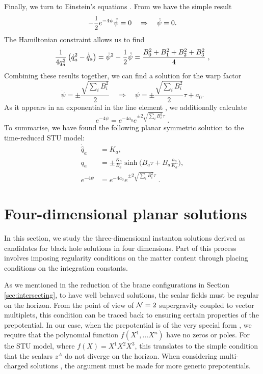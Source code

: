 Finally, we turn to Einstein's equations . From  we have the simple result
\begin{equation*}
-\frac{1}{2} e^{-4\psi} \ddot{\psi} = 0 \quad \Rightarrow \quad \ddot{\psi} = 0.
\end{equation*}
The Hamiltonian constraint  allows us to find
\begin{equation}
\frac{1}{4q_a^2} \left(\dot{q}_a^2 - \dot{\hat{q}}_a \right) = \dot{\psi}^2 - \frac{1}{2} \ddot{\psi} = \frac{B_0^2 + B_1^2 + B_2^2 + B_3^2}{4} \; ,
\end{equation}
Combining these results together, we can find a solution for the warp factor
\begin{equation*}
\dot{\psi} = \pm \frac{\sqrt{\sum_iB_i^2}}{2} \quad \Rightarrow \quad \psi = \pm \frac{\sqrt{\sum_iB_i^2}}{2}\tau + a_0.
\end{equation*}
As it appears in an exponential in the line element , we additionally calculate
\begin{equation}
e^{-4\psi} = e^{-4a_0} e^{\pm 2\sqrt{\sum_iB_i^2} \tau} \; .
\end{equation}
To summarise, we have found the following planar symmetric solution to the time-reduced STU model:
\begin{equation}
    \begin{aligned}
      \dot{\hat{q}}_a &= K_a, \\
      q_a &= \pm \frac{K_a}{B_a} \sinh \bigg(B_a \tau + B_a \frac{h_a}{K_a} \bigg), \\
         e^{-4\psi} &= e^{-4a_0} e^{\pm 2\sqrt{\sum_i B_i^2} \tau} \; .\label{STU1}
    \end{aligned}
\end{equation}


\section{Four-dimensional planar solutions}
\label{sec:4dSolutions}

In this section, we study the three-dimensional instanton solutions derived as candidates for black hole solutions in four dimensions. Part of this process involves imposing regularity conditions on the matter content through placing conditions on the integration constants. 

As we mentioned in the reduction of the brane configurations in Section \ref{sec:intersecting}, to have well behaved solutions, the scalar fields must be regular on the horizon. From the point of view of ${\cal N} = 2$ supergravity coupled to vector multiplets, this condition can be traced back to ensuring certain properties of the prepotential. In our case, when the prepotential is of the very special form , we require that the polynomial function $f(X^1, \ldots X^n)$ have no zeros or poles. For the STU model, where $f(X) = X^1 X^2 X^3$, this translates to the simple condition that the scalars $z^A$ do not diverge on the horizon. When considering multi-charged solutions \cite{Gutowski:2019iyo}, the argument must be made for more generic prepotentials.

